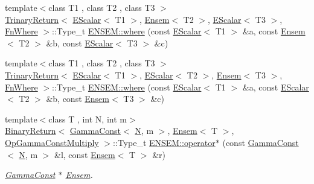 \begin{DoxyCompactItemize}
\item 
{\footnotesize template$<$class T1 , class T2 , class T3 $>$ }\\\mbox{\hyperlink{structENSEM_1_1TrinaryReturn}{Trinary\+Return}}$<$ \mbox{\hyperlink{classENSEM_1_1EScalar}{E\+Scalar}}$<$ T1 $>$, \mbox{\hyperlink{classENSEM_1_1Ensem}{Ensem}}$<$ T2 $>$, \mbox{\hyperlink{classENSEM_1_1EScalar}{E\+Scalar}}$<$ T3 $>$, \mbox{\hyperlink{structENSEM_1_1FnWhere}{Fn\+Where}} $>$\+::Type\+\_\+t \mbox{\hyperlink{group__eensem_gaa4e0f13f6f2d07520289a95c6290a38b}{E\+N\+S\+E\+M\+::where}} (const \mbox{\hyperlink{classENSEM_1_1EScalar}{E\+Scalar}}$<$ T1 $>$ \&a, const \mbox{\hyperlink{classENSEM_1_1Ensem}{Ensem}}$<$ T2 $>$ \&b, const \mbox{\hyperlink{classENSEM_1_1EScalar}{E\+Scalar}}$<$ T3 $>$ \&c)
\item 
{\footnotesize template$<$class T1 , class T2 , class T3 $>$ }\\\mbox{\hyperlink{structENSEM_1_1TrinaryReturn}{Trinary\+Return}}$<$ \mbox{\hyperlink{classENSEM_1_1EScalar}{E\+Scalar}}$<$ T1 $>$, \mbox{\hyperlink{classENSEM_1_1EScalar}{E\+Scalar}}$<$ T2 $>$, \mbox{\hyperlink{classENSEM_1_1Ensem}{Ensem}}$<$ T3 $>$, \mbox{\hyperlink{structENSEM_1_1FnWhere}{Fn\+Where}} $>$\+::Type\+\_\+t \mbox{\hyperlink{group__eensem_gab6c29ad51b23e921cd47448cfa4eabaa}{E\+N\+S\+E\+M\+::where}} (const \mbox{\hyperlink{classENSEM_1_1EScalar}{E\+Scalar}}$<$ T1 $>$ \&a, const \mbox{\hyperlink{classENSEM_1_1EScalar}{E\+Scalar}}$<$ T2 $>$ \&b, const \mbox{\hyperlink{classENSEM_1_1Ensem}{Ensem}}$<$ T3 $>$ \&c)
\item 
{\footnotesize template$<$class T , int N, int m$>$ }\\\mbox{\hyperlink{structENSEM_1_1BinaryReturn}{Binary\+Return}}$<$ \mbox{\hyperlink{classENSEM_1_1GammaConst}{Gamma\+Const}}$<$ \mbox{\hyperlink{adat__devel_2lib_2hadron_2operator__name__util_8cc_a7722c8ecbb62d99aee7ce68b1752f337}{N}}, m $>$, \mbox{\hyperlink{classENSEM_1_1Ensem}{Ensem}}$<$ T $>$, \mbox{\hyperlink{structENSEM_1_1OpGammaConstMultiply}{Op\+Gamma\+Const\+Multiply}} $>$\+::Type\+\_\+t \mbox{\hyperlink{group__eensem_gab92286e5b611f00cb8f733f9d41d06a4}{E\+N\+S\+E\+M\+::operator$\ast$}} (const \mbox{\hyperlink{classENSEM_1_1GammaConst}{Gamma\+Const}}$<$ \mbox{\hyperlink{adat__devel_2lib_2hadron_2operator__name__util_8cc_a7722c8ecbb62d99aee7ce68b1752f337}{N}}, m $>$ \&l, const \mbox{\hyperlink{classENSEM_1_1Ensem}{Ensem}}$<$ T $>$ \&r)
\begin{DoxyCompactList}\small\item\em \mbox{\hyperlink{classENSEM_1_1GammaConst}{Gamma\+Const}} $\ast$ \mbox{\hyperlink{classENSEM_1_1Ensem}{Ensem}}. \end{DoxyCompactList}\item 

\end{DoxyCompactItemize}
